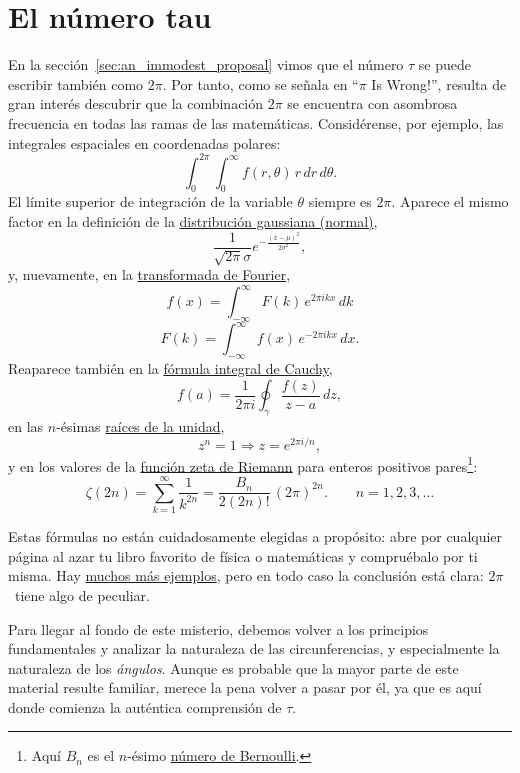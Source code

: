 
\section{El número tau} %
\label{sec:the_number_tau}

En la sección~\ref{sec:an_immodest_proposal} vimos que el número $\tau$ se puede escribir también como $2\pi$. Por tanto, como se señala en ``$\pi$ Is Wrong!'', resulta de gran interés descubrir que la combinación $2\pi$ se encuentra con asombrosa frecuencia en todas las ramas de las matemáticas. Considérense, por ejemplo, las integrales espaciales en coordenadas polares:
\[
  \int_0^{2\pi}\int_0^\infty f(r, \theta)\, r\, dr\, d\theta.
\]
El límite superior de integración de la variable $\theta$ siempre es $2\pi$. Aparece el mismo factor en la definición de la \href{https://es.wikipedia.org/wiki/Distribución_normal}{distribución gaussiana (normal)},
\[
  \frac{1}{\sqrt{2\pi}\sigma}e^{-\frac{(x-\mu)^2}{2\sigma^2}},
\]
y, nuevamente, en la  \href{http://mathworld.wolfram.com/FourierTransform.html}{transformada de Fourier},
\[
  f(x) = \int_{-\infty}^\infty F(k)\, e^{2\pi ikx}\,dk
\]
\[
    F(k) = \int_{-\infty}^\infty f(x)\, e^{-2\pi ikx}\,dx.
\]
Reaparece también en la \href{https://es.wikipedia.org/wiki/Fórmula_integral_de_Cauchy}{fórmula integral de Cauchy},
\[
  f(a) = \frac{1}{2\pi i}\oint_\gamma\frac{f(z)}{z-a}\,dz,
\]
en las $n$-ésimas \href{https://es.wikipedia.org/wiki/Raíz_de_la_unidad}{raíces de la unidad},
\[
  z^n = 1 \Rightarrow z = e^{2\pi i/n},
\]
y en los valores de la \href{https://es.wikipedia.org/wiki/Función_zeta_de_Riemann}{función zeta de Riemann} para enteros positivos pares\footnote{Aquí $B_n$ es el $n$-ésimo \href{https://es.wikipedia.org/wiki/Número_de_Bernoulli}{número de Bernoulli}.}:
\[
  \zeta(2n) = \sum_{k=1}^\infty \frac{1}{k^{2n}} = \frac{B_n}{2(2n)!}\,(2\pi)^{2n}.\qquad n = 1, 2, 3, \ldots
\]

Estas fórmulas no están cuidadosamente elegidas a propósito: abre por cualquier página al azar tu libro favorito de física o matemáticas y compruébalo por ti misma. Hay \href{http://www.harremoes.dk/Peter/Undervis/Turnpage/Turnpage1.html}{muchos más ejemplos}, pero en todo caso la conclusión está clara: $2\pi$~tiene algo de peculiar.

Para llegar al fondo de este misterio, debemos volver a los principios fundamentales y analizar la naturaleza de las circunferencias, y especialmente la naturaleza de los \emph{ángulos}. Aunque es probable que la mayor parte de este material resulte familiar, merece la pena volver a pasar por él, ya que es aquí donde comienza la auténtica comprensión de $\tau$.

